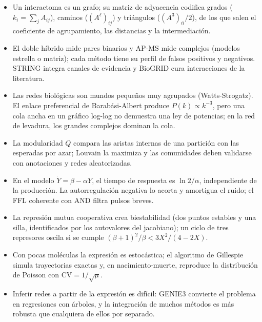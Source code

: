 \begin{resumen}
\begin{itemize}
  \item Un interactoma es un grafo; su matriz de adyacencia codifica grados ($k_i=\sum_jA_{ij}$), caminos ($(A^\ell)_{ij}$) y triángulos ($(A^3)_{ii}/2$), de los que salen el coeficiente de agrupamiento, las distancias y la intermediación.
  \item El doble híbrido mide pares binarios y AP-MS mide complejos (modelos estrella o matriz); cada método tiene su perfil de falsos positivos y negativos. STRING integra canales de evidencia y BioGRID cura interacciones de la literatura.
  \item Las redes biológicas son mundos pequeños muy agrupados (Watts-Strogatz). El enlace preferencial de Barabási-Albert produce $P(k)\propto k^{-3}$, pero una cola ancha en un gráfico log-log no demuestra una ley de potencias; en la red de levadura, los grandes complejos dominan la cola.
  \item La modularidad $Q$ compara las aristas internas de una partición con las esperadas por azar; Louvain la maximiza y las comunidades deben validarse con anotaciones y redes aleatorizadas.
  \item En el modelo $\dot Y=\beta-\alpha Y$, el tiempo de respuesta es $\ln2/\alpha$, independiente de la producción. La autorregulación negativa lo acorta y amortigua el ruido; el FFL coherente con AND filtra pulsos breves.
  \item La represión mutua cooperativa crea biestabilidad (dos puntos estables y una silla, identificados por los autovalores del jacobiano); un ciclo de tres represores oscila si se cumple $(\beta+1)^2/\beta<3X^2/(4-2X)$.
  \item Con pocas moléculas la expresión es estocástica; el algoritmo de Gillespie simula trayectorias exactas y, en nacimiento-muerte, reproduce la distribución de Poisson con $\mathrm{CV}=1/\sqrt{\mu}$.
  \item Inferir redes a partir de la expresión es difícil: GENIE3 convierte el problema en regresiones con árboles, y la integración de muchos métodos es más robusta que cualquiera de ellos por separado.
\end{itemize}
\end{resumen}

